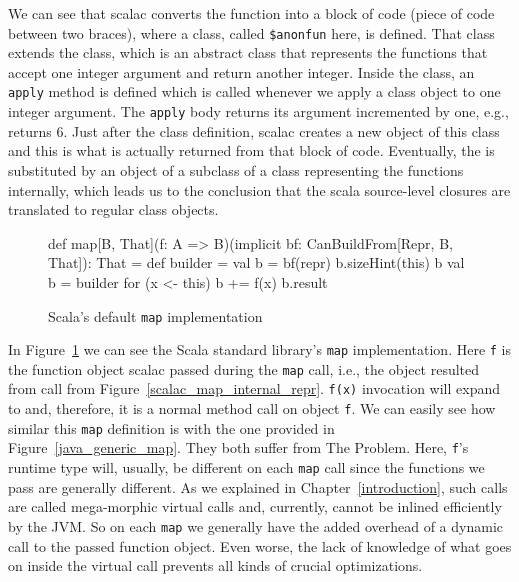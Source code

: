 We can see that scalac converts the  function into a block of code
(piece of code between two braces), where a class, called \texttt{\$anonfun} here, is defined.
That class extends the  class, which is an abstract
class that represents the functions that accept one integer argument and return
another integer. Inside the class, an \texttt{apply} method is defined which is called
whenever we apply a class object to one integer argument. The \texttt{apply} body
returns  its argument incremented by one,  e.g.,  returns $6$. Just after the class definition, scalac creates a new object
of this class and this is what is actually returned from that block of code.
Eventually, the  is substituted by an object of a subclass of a class
representing the functions internally, which leads us to the conclusion that the
scala source-level closures are translated to regular class objects.

\begin{figure}
\begin{scalaCode}
def map[B, That](f: A => B)(implicit bf: CanBuildFrom[Repr, B, That]): That =
{
    def builder = {
      val b = bf(repr)
      b.sizeHint(this)
      b
    }
    val b = builder
    for (x <- this) b += f(x)
    b.result
}
\end{scalaCode}
\caption[Scala's default \texttt{map} implementation]{Scala's default \texttt{map} implementation}
\label{scala_map}
\end{figure}

In Figure~\ref{scala_map} we can see the Scala standard library's \texttt{map} implementation. Here \texttt{f} is the function object scalac passed during the \texttt{map} call, i.e., the
object resulted from  call from Figure~\ref{scalac_map_internal_repr}. 
\texttt{f(x)} invocation will expand to
 and, therefore, it is a normal method call on object \texttt{f}. We can easily see
how similar this \texttt{map} definition is with the one provided in Figure~\ref{java_generic_map}.
They both suffer from The Problem. Here, \texttt{f}'s runtime type will, usually, be
different on each \texttt{map} call since the functions we pass are generally different.
As we explained in Chapter~\ref{introduction}, such calls are called mega-morphic virtual calls and, currently, cannot be inlined efficiently
by the JVM. So on each \texttt{map} we
generally have the added overhead of a dynamic call to the passed function
object. Even worse, the lack of knowledge of what goes on inside the virtual
call prevents all kinds of crucial optimizations.

